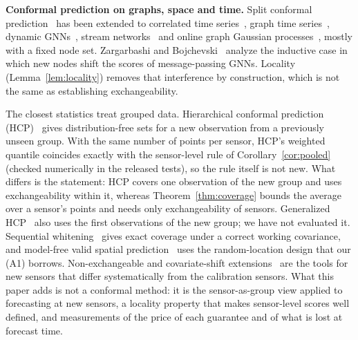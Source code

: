 \documentclass[journal,twoside,web]{ieeecolor}
\begin{document}
\textbf{Conformal prediction on graphs, space and time.} Split
conformal prediction~\cite{vovk2005algorithmic,angelopoulos2023conformal} has been extended to correlated time
series~\cite{corel2025}, graph time series~\cite{conformalgraphts2026,incontextresidual2026}, dynamic GNNs~\cite{validcpdyngnn2024,nonexchcptgnn2025}, stream networks~\cite{staci2025} and online graph Gaussian processes~\cite{conformalgp_online2025}, mostly with a fixed node set. Zargarbashi and
Bojchevski~\cite{conformalinductivegnn2024} analyze the inductive case in which new nodes shift the scores of
message-passing GNNs. Locality (Lemma~\ref{lem:locality}) removes that interference by construction, which is not
the same as establishing exchangeability.

The closest statistics treat grouped data. Hierarchical conformal prediction
(HCP)~\cite{lee2023hcp} gives distribution-free sets for a new observation from a previously unseen group. With the
same number of points per sensor, HCP's weighted quantile coincides exactly with the sensor-level rule of
Corollary~\ref{cor:pooled} (checked numerically in the released tests), so the rule itself is not new. What differs is the statement: HCP covers one observation of the new group and uses exchangeability within it, whereas Theorem~\ref{thm:coverage} bounds the average over a sensor's points and needs only exchangeability of sensors. Generalized HCP~\cite{mallick2026ghcp} also uses the first observations of the new
group; we have not evaluated it. Sequential
whitening~\cite{sen2026whitening} gives exact coverage under a correct working covariance, and model-free valid
spatial prediction~\cite{validspatial2020} uses the random-location design that our (A1) borrows. Non-exchangeable and
covariate-shift extensions~\cite{barber2023nexcp,tibshirani2019covshift} are the tools for new sensors that differ
systematically from the calibration sensors. What this paper adds is not a conformal method: it is the
sensor-as-group view applied to forecasting at new sensors, a locality property that makes sensor-level scores well
defined, and measurements of the price of each guarantee and of what is lost at forecast time.

\end{document}
